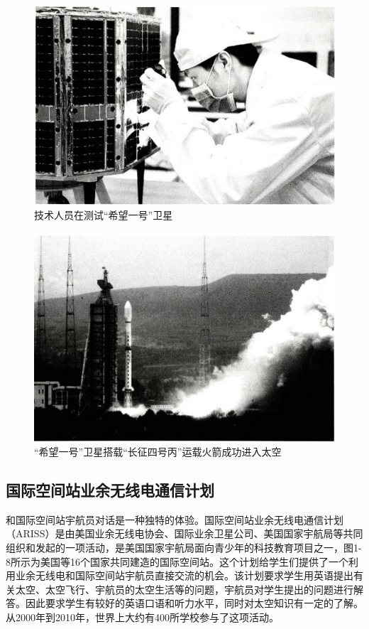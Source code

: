 \documentclass[12pt,UTF8]{ctexbook}
\begin{document}
\begin{figure}[htbp]
	\centering
	\includegraphics[width=0.7\linewidth]{6}
	\caption{技术人员在测试“希望一号”卫星}
	\label{fig:1}
\end{figure}

\begin{figure}[htbp]
	\centering
	\includegraphics[width=0.7\linewidth]{7}
	\caption{“希望一号”卫星搭载“长征四号丙”运载火箭成功进入太空}
	\label{fig:1}
\end{figure}

\subsection{国际空间站业余无线电通信计划}

和国际空间站宇航员对话是一种独特的体验。国际空间站业余无线电通信计划（ARISS）是由美国业余无线电协会、国际业余卫星公司、美国国家宇航局等共同组织和发起的一项活动，是美国国家宇航局面向青少年的科技教育项目之一，图1-8所示为美国等16个国家共同建造的国际空间站。这个计划给学生们提供了一个利用业余无线电和国际空间站宇航员直接交流的机会。该计划要求学生用英语提出有关太空、太空飞行、宇航员的太空生活等的问题，宇航员对学生提出的问题进行解答。因此要求学生有较好的英语口语和听力水平，同时对太空知识有一定的了解。从2000年到2010年，世界上大约有400所学校参与了这项活动。
\end{document}
